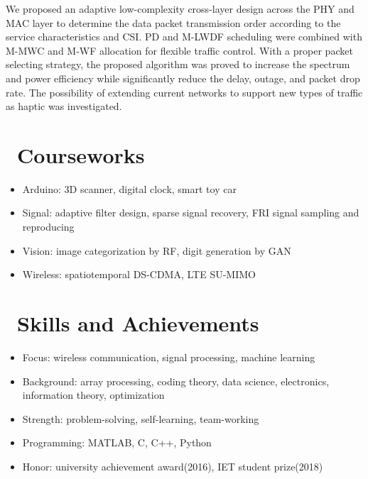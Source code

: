 \documentclass{resume}
\begin{document}
We proposed an adaptive low-complexity cross-layer design across the PHY and MAC layer to determine the data packet transmission order according to the service characteristics and CSI. PD and M-LWDF scheduling were combined with M-MWC and M-WF allocation for flexible traffic control. With a proper packet selecting strategy, the proposed algorithm was proved to increase the spectrum and power efficiency while significantly reduce the delay, outage, and packet drop rate. The possibility of extending current networks to support new types of traffic as haptic was investigated.

\section{\faTasks\ Courseworks}

\begin{itemize}[noitemsep,nolistsep]
  \item Arduino: 3D scanner, digital clock, smart toy car
  \item Signal: adaptive filter design, sparse signal recovery, FRI signal sampling and reproducing
  \item Vision: image categorization by RF, digit generation by GAN
  \item Wireless: spatiotemporal DS-CDMA, LTE SU-MIMO
\end{itemize}

\section{\faHeartO\ Skills and Achievements}

\begin{itemize}[noitemsep,nolistsep]
  \item Focus: wireless communication, signal processing, machine learning
  \item Background: array processing, coding theory, data science, electronics, information theory, optimization
  \item Strength: problem-solving, self-learning, team-working
  \item Programming: MATLAB, C, C++, Python
  \item Honor: university achievement award(2016), IET student prize(2018)
\end{itemize}
\end{document}
